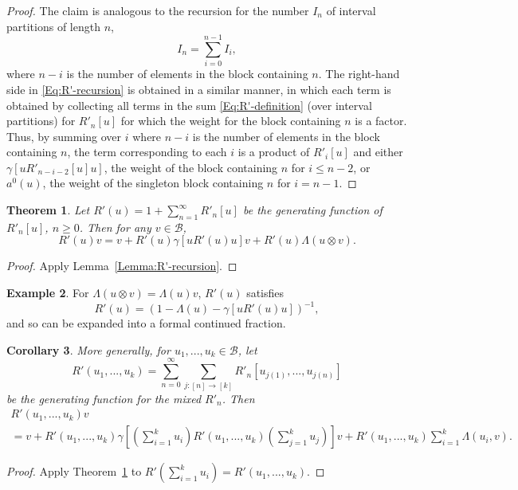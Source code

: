 \documentclass[12pt]{amsart}
\newtheorem{Thm}{Theorem}
\newtheorem{Cor}[Thm]{Corollary}
\theoremstyle{definition}
\newtheorem{Example}[Thm]{Example}
\newcommand{\mc}[1]{\mathcal{#1}}
\begin{document}
\begin{proof}
The claim is analogous to the recursion for the number $I_n$ of interval partitions of length $n$,
\begin{equation*}
I_n = \sum_{i=0}^{n-1} I_i,
\end{equation*}
where $n-i$ is the number of elements in the block containing $n$. The right-hand side in \eqref{Eq:R'-recursion} is obtained in a similar manner, in which each term is obtained by collecting all terms in the sum \eqref{Eq:R'-definition} (over interval partitions) for $R'_n[u]$ for which the weight for the block containing $n$ is a factor. Thus, by summing over $i$ where $n-i$ is the number of elements in the block containing $n$, the term corresponding to each $i$ is a product of $R'_i[u]$ and either $\gamma [u R'_{n-i-2}[u]u]$, the weight of the block containing $n$ for $i \leq n-2$, or $a^0(u)$, the weight of the singleton block containing $n$ for $i = n-1$.
\end{proof}

\begin{Thm}\label{Thm:CumulantGF}
	Let $R'(u) = 1 + \sum_{n=1}^\infty R'_n[u]$ be the generating function of $R'_n[u]$, $n \geq 0$. Then for any $v \in \mc{B}$,
\begin{equation}
	R'(u) v = v + R'(u) \gamma\left[ u R'(u) u \right] v + R'(u) \Lambda(u \otimes v).
	\end{equation}
\end{Thm}

\begin{proof}
Apply Lemma~\ref{Lemma:R'-recursion}.
\end{proof}


\begin{Example}
For $\Lambda(u \otimes v) = \Lambda(u) v$, $R'(u)$ satisfies
\[
R'(u) = \left( 1 - \Lambda(u) - \gamma[u R'(u) u] \right)^{-1},
\]
and so can be expanded into a formal continued fraction.
\end{Example}

\begin{Cor}\label{Cor:MultiCumulantGF}More generally, for $u_1, ..., u_k\in\mc{B}$, let
\[
R'(u_1, ..., u_k) = \sum_{n=0}^\infty \sum_{j : [n] \rightarrow [k]} R'_n[u_{j(1)},...,u_{j(n)}]
\]
be the generating function for the mixed $R'_n$. Then
	\begin{multline}
	R'(u_1, ..., u_k)v \\
= v + R'(u_1, ..., u_k)\gamma\left[ \left(\sum_{i=1}^{k}u_i\right) R'(u_1, ..., u_k)\left(\sum_{j=1}^{k}u_j\right) \right]v + R'(u_1, ..., u_k) \sum_{i=1}^{k}\Lambda(u_i, v).
	\end{multline}
\end{Cor}
\begin{proof}
	Apply Theorem~\ref{Thm:CumulantGF} to $R'\left( \sum_{i=1}^{k}u_i \right) = R'(u_1, ..., u_k)$.
\end{proof}
\end{document}
